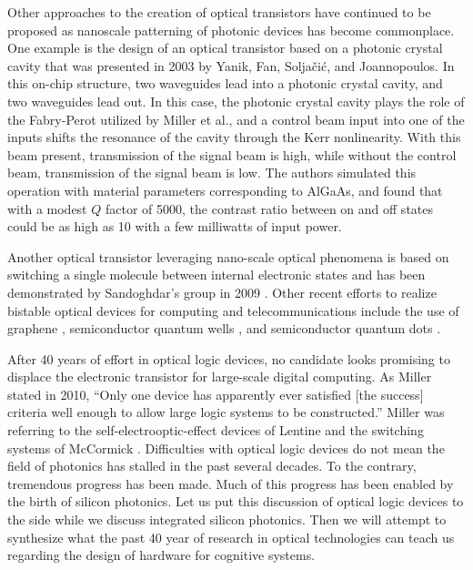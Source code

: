 Other approaches to the creation of optical transistors have continued to be proposed as nanoscale patterning of photonic devices has become commonplace. One example is the design of an optical transistor based on a photonic crystal cavity \cite{yafa2003} that was presented in 2003 by Yanik, Fan, Solja\v{c}i\'{c}, and Joannopoulos. In this on-chip structure, two waveguides lead into a photonic crystal cavity, and two waveguides lead out. In this case, the photonic crystal cavity plays the role of the Fabry-Perot utilized by Miller et al., and a control beam input into one of the inputs shifts the resonance of the cavity through the Kerr nonlinearity. With this beam present, transmission of the signal beam is high, while without the control beam, transmission of the signal beam is low. The authors simulated this operation with material parameters corresponding to AlGaAs, and found that with a modest $Q$ factor of 5000, the contrast ratio between on and off states could be as high as 10 with a few milliwatts of input power. 

Another optical transistor leveraging nano-scale optical phenomena is based on switching a single molecule between internal electronic states and has been demonstrated by Sandoghdar's group in 2009 \cite{hwpo2009}. Other recent efforts to realize bistable optical devices for computing and telecommunications include the use of graphene \cite{wawu2016,guru2017}, semiconductor quantum wells \cite{suzh2019,saeb2018}, and semiconductor quantum dots \cite{lili2019}. 

After 40 years of effort in optical logic devices, no candidate looks promising to displace the electronic transistor for large-scale digital computing. As Miller stated in 2010, ``Only one device has apparently ever satisfied [the success] criteria well enough to allow large logic systems to be constructed.'' \cite{mi2010} Miller was referring to the self-electrooptic-effect devices of Lentine \cite{lehi1989} and the switching systems of McCormick \cite{mccl1993}. Difficulties with optical logic devices do not mean the field of photonics has stalled in the past several decades. To the contrary, tremendous progress has been made. Much of this progress has been enabled by the birth of silicon photonics. Let us put this discussion of optical logic devices to the side while we discuss integrated silicon photonics. Then we will attempt to synthesize what the past 40 year of research in optical technologies can teach us regarding the design of hardware for cognitive systems.

